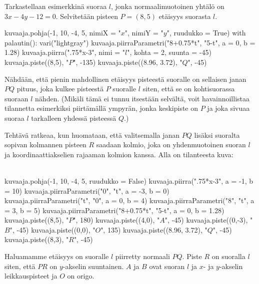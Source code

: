 Tarkastellaan esimerkkinä suoraa $l$, jonka normaalimuotoinen yhtälö on $3x-4y -12=0$.
Selvitetään pisteen $P=(8, 5)$ etäisyys suorasta $l$.

\begin{kuva}
    kuvaaja.pohja(-1, 10, -4, 5, nimiX = "$x$", nimiY = "$y$", ruudukko = True)
    with palautin():
        vari("lightgray")
        kuvaaja.piirraParametri("8+0.75*t", "5-t", a = 0, b = 1.28)
    kuvaaja.piirra(".75*x-3", nimi = "$l$", kohta = 2, suunta = -45)    
    kuvaaja.piste((8,5), "$P$", -135)
    kuvaaja.piste((8.96, 3.72), "$Q$", -45)
\end{kuva}


Nähdään, että pienin mahdollinen etäisyys pisteestä suoralle on sellaisen janan $PQ$ pituus, joka kulkee pisteestä $P$ suoralle $l$ siten, että se on kohtisuorassa suoraan $l$ nähden. (Mikäli tämä ei tunnu itsestään selvältä, voit havainnoillistaa tilannetta esimerkiksi piirtämällä ympyrän, jonka keskipiste on $P$ ja joka sivuaa suoraa $l$ tarkalleen yhdessä pisteessä $Q$.)

Tehtävä ratkeaa, kun huomataan, että valitsemalla janan $PQ$ lisäksi suoralta sopivan kolmannen pisteen $R$ saadaan kolmio, joka on yhdenmuotoinen suoran $l$ ja koordinaattiakselien rajaaman kolmion kanssa. Alla on tilanteesta kuva:


\begin{kuva}\\
    kuvaaja.pohja(-1, 10, -4, 5, ruudukko = False)
    kuvaaja.piirra(".75*x-3", a = -1, b = 10)
    kuvaaja.piirraParametri("0", "t", a = -3, b = 0)
    kuvaaja.piirraParametri("t", "0", a = 0, b = 4)
    kuvaaja.piirraParametri("8", "t", a = 3, b = 5)
    kuvaaja.piirraParametri("8+0.75*t", "5-t", a = 0, b = 1.28)
    kuvaaja.piste((8,5), "$P$", 180)
    kuvaaja.piste((4,0), "$A$", -45)
    kuvaaja.piste((0,-3), "$B$", -45)
    kuvaaja.piste((0,0), "$O$", 135)
    kuvaaja.piste((8.96, 3.72), "$Q$", -45)
    kuvaaja.piste((8,3), "$R$", -45)
\end{kuva}

Haluamamme etäisyys on suoralle $l$ piirretty normaali $PQ$. Piste $R$ on suoralla $l$ siten, että $PR$ on $y$-akselin suuntainen. $A$ ja $B$ ovat suoran $l$ ja $x$- ja $y$-akselin leikkauspisteet ja $O$ on origo.

